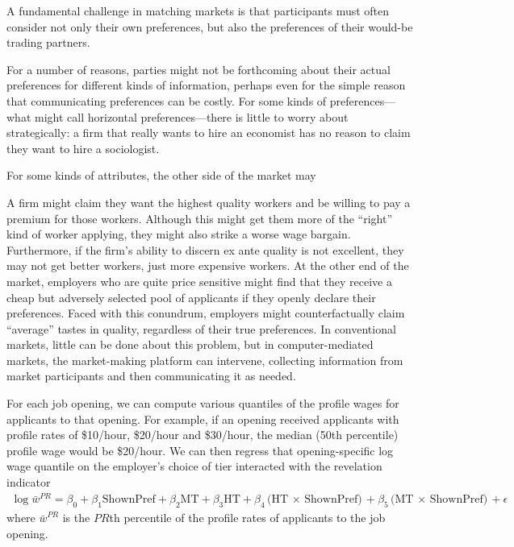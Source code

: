  A fundamental challenge in matching markets is that participants must often consider not only their own preferences, but also the preferences of their would-be trading partners. 


For a number of reasons, parties might not be forthcoming about their actual preferences for different kinds of information, perhaps even for the simple reason that communicating preferences can be costly.
For some kinds of preferences---what might call horizontal preferences---there is little to worry about strategically: 
a firm that really wants to hire an economist has no reason to claim they want to hire a sociologist. 

For some kinds of attributes, the other side of the market may

A firm might claim they want the highest quality workers and be willing to pay a premium for those workers. 
Although this might get them more of the ``right'' kind of worker applying, they might also strike a worse wage bargain. 
Furthermore, if the firm's ability to discern ex ante quality is not excellent, they may not get better workers, just more expensive workers. 
At the other end of the market, employers who are quite price sensitive might find that they receive a cheap but adversely selected pool of applicants if they openly declare their preferences.
Faced with this conundrum, employers might counterfactually claim ``average'' tastes in quality, regardless of their true preferences.
In conventional markets, little can be done about this problem, but in computer-mediated markets, the market-making platform can intervene, collecting information from market participants and then communicating it as needed. 



For each job opening, we can compute various quantiles of the profile wages for applicants to that opening. 
For example, if an opening received applicants with profile rates of \$10/hour, \$20/hour and \$30/hour, the median (50th percentile) profile wage would be \$20/hour. 
We can then regress that opening-specific log wage quantile on the employer's choice of tier interacted with the revelation indicator 
\begin{align} \label{eq:pr}
  \log \bar{w}^{PR} = \beta_0 + \beta_1 \mbox{ShownPref} + \beta_2 \mbox{MT} + \beta_3 \mbox{HT} + \beta_4 \mbox{(HT $\times$ ShownPref)} + \beta_5 \mbox{(MT $\times$ ShownPref)} + \epsilon
\end{align} 
where $\bar{w}^{PR}$ is the $PR$th percentile of the profile rates of applicants to the job opening. 

